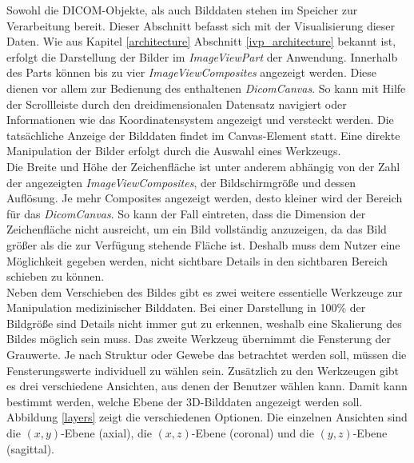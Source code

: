Sowohl die DICOM-Objekte, als auch Bilddaten stehen im Speicher zur Verarbeitung bereit. Dieser Abschnitt befasst sich mit der Visualisierung dieser Daten. Wie aus Kapitel \ref{architecture} Abschnitt \ref{ivp_architecture} bekannt ist, erfolgt die Darstellung der Bilder im \textit{ImageViewPart} der Anwendung. Innerhalb des Parts können bis zu vier \textit{ImageViewComposites } angezeigt werden. Diese dienen vor allem zur Bedienung des enthaltenen \textit{DicomCanvas}. So kann mit Hilfe der Scrollleiste durch den dreidimensionalen Datensatz navigiert oder Informationen wie das Koordinatensystem angezeigt und versteckt werden. Die tatsächliche Anzeige der Bilddaten findet im Canvas-Element statt. Eine direkte Manipulation der Bilder erfolgt durch die Auswahl eines Werkzeugs.\\
Die Breite und Höhe der Zeichenfläche ist unter anderem abhängig von der Zahl der angezeigten \textit{ImageViewComposites}, der Bildschirmgröße und dessen Auflösung. Je mehr Composites angezeigt werden, desto kleiner wird der Bereich für das \textit{DicomCanvas}. So kann der Fall eintreten, dass die Dimension der Zeichenfläche nicht ausreicht, um ein Bild vollständig anzuzeigen, da das Bild größer als die zur Verfügung stehende Fläche ist. Deshalb muss dem Nutzer eine Möglichkeit gegeben werden, nicht sichtbare Details in den sichtbaren Bereich schieben zu können.\\
Neben dem Verschieben des Bildes gibt es zwei weitere essentielle Werkzeuge zur Manipulation medizinischer Bilddaten. Bei einer Darstellung in 100\% der Bildgröße sind Details nicht immer gut zu erkennen, weshalb eine Skalierung des Bildes möglich sein muss.
Das zweite Werkzeug übernimmt die Fensterung der Grauwerte. Je nach Struktur oder Gewebe das betrachtet werden soll, müssen die Fensterungswerte individuell zu wählen sein.
Zusätzlich zu den Werkzeugen gibt es drei verschiedene Ansichten, aus denen der Benutzer wählen kann. Damit kann bestimmt werden, welche Ebene der 3D-Bilddaten angezeigt werden soll. Abbildung \ref{layers} zeigt die verschiedenen Optionen. Die einzelnen Ansichten sind die $(x,y)$-Ebene (axial), die $(x,z)$-Ebene (coronal) und die $(y,z)$-Ebene (sagittal).\\
